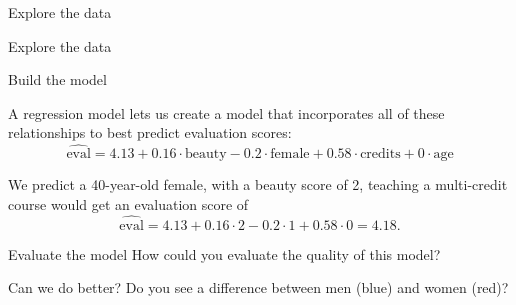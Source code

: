 \documentclass{beamer}\usepackage[]{graphicx}\usepackage[]{color}
\newenvironment{knitrout}{}{} %
\begin{document}
\begin{darkframes}
    \begin{frame}{Explore the data}
\begin{knitrout}


\end{knitrout}
    \end{frame}

    \begin{frame}{Explore the data}
\begin{knitrout}


\end{knitrout}
    \end{frame}

    \begin{frame}{Build the model}
      
      \begin{center}
        A regression model lets us create a model that incorporates all of these relationships to best predict evaluation scores:
        \[
          \widehat{\text{eval}} =
            4.13 +
            0.16 \cdot \text{beauty} -
            0.2 \cdot \text{female} +
            0.58 \cdot \text{credits} +
            0 \cdot \text{age}
        \]

        \pause

        We predict a 40-year-old female, with a beauty score of 2, teaching a multi-credit course would get an evaluation score of
        \[
          \widehat{\text{eval}} = 4.13 + 0.16 \cdot 2 - 0.2 \cdot 1 + 0.58 \cdot 0 = 4.18.
        \]

      \end{center}
    \end{frame}

    \begin{frame}{Evaluate the model}
      How could you evaluate the quality of this model?
    \end{frame}

    \begin{frame}{Can we do better?}
      Do you see a difference between men (blue) and women (red)?


\end{frame}
\end{darkframes}
\end{document}
